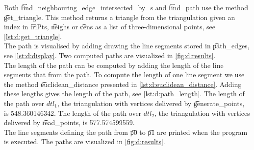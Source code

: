 	Both \t{find_neighbouring_edge_intersected_by_s} and \t{find_path} use the method \t{get_triangle}. This method returns a triangle from the triangulation given an index in \t{triPts}, \t{neighs} or \t{cens} as a list of three-dimensional points, see \autoref{lst:d:get_triangle}.\\

	

	

	

	The path is visualised by adding drawing the line segments stored in \t{path_edges}, see \autoref{lst:d:display}. Two computed paths are visualized in \autoref{fig:d:results}.\\

	

	The length of the path can be computed by adding the length of the line segments that from the path. To compute the length of one line segment we use the method \t{euclidean_distance} presented in \autoref{lst:d:euclidean_distance}. Adding these lengths gives the length of the path, see \autoref{lst:d:path_length}. The length of the path over $dtl_1$, the triangulation with vertices delivered by \t{generate_points}, is \num{548.360146342}. The length of the path over $dtl_2$, the triangulation with vertices delivered by \t{read_points}, is \num{577.574599559}.\\

	

	

	The line segments defining the path from \t{p0} to \t{p1} are printed when the program is executed. The paths are visualized in \autoref{fig:d:results}.


